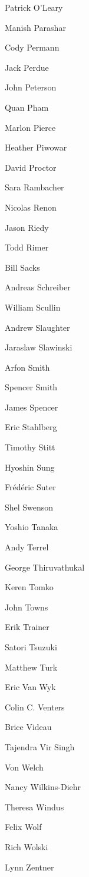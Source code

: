 \documentclass[11pt, oneside]{amsart}
\begin{document}
\begin{multicols}{3}
Patrick O'Leary

Manish Parashar

Cody Permann

Jack Perdue

John Peterson

Quan Pham

Marlon Pierce

Heather Piwowar

David Proctor

Sara Rambacher

Nicolas Renon

Jason Riedy

Todd Rimer

Bill Sacks

Andreas Schreiber

William Scullin

Andrew Slaughter

Jaraslaw Slawinski

Arfon Smith

Spencer Smith

James Spencer

Eric Stahlberg

Timothy Stitt

Hyoshin Sung

Fr\'{e}d\'{e}ric Suter

Shel Swenson

Yoshio Tanaka

Andy Terrel

George  Thiruvathukal

Keren Tomko

John Towns

Erik Trainer

Satori Tsuzuki

Matthew Turk

Eric Van Wyk

Colin C. Venters

Brice Videau

Tajendra Vir Singh

Von Welch

Nancy Wilkins-Diehr

Theresa Windus

Felix Wolf

Rich Wolski

Lynn Zentner

\end{multicols}






\end{document}

